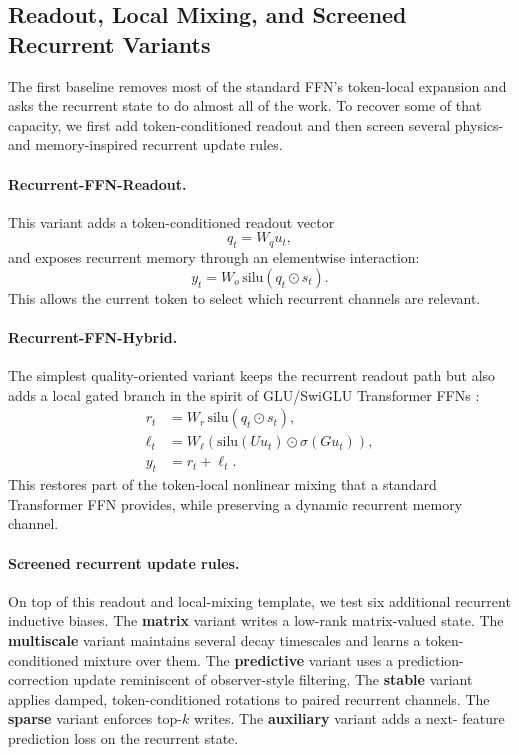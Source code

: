 \documentclass[11pt]{article}
\begin{document}
\subsection{Readout, Local Mixing, and Screened Recurrent Variants}
The first baseline removes most of the standard FFN's token-local expansion and
asks the recurrent state to do almost all of the work. To recover some of that
capacity, we first add token-conditioned readout and then screen several
physics- and memory-inspired recurrent update rules.

\paragraph{Recurrent-FFN-Readout.}
This variant adds a token-conditioned readout vector
\begin{equation}
q_t = W_q u_t,
\end{equation}
and exposes recurrent memory through an elementwise interaction:
\begin{equation}
y_t = W_o \, \mathrm{silu}(q_t \odot s_t).
\end{equation}
This allows the current token to select which recurrent channels are relevant.

\paragraph{Recurrent-FFN-Hybrid.}
The simplest quality-oriented variant keeps the recurrent readout path but also
adds a local gated branch in the spirit of GLU/SwiGLU Transformer FFNs
\citep{shazeer2020glu}:
\begin{align}
r_t &= W_r \, \mathrm{silu}(q_t \odot s_t), \\
\ell_t &= W_\ell \left(\mathrm{silu}(U u_t) \odot \sigma(G u_t)\right), \\
y_t &= r_t + \ell_t.
\end{align}
This restores part of the token-local nonlinear mixing that a standard
Transformer FFN provides, while preserving a dynamic recurrent memory channel.

\paragraph{Screened recurrent update rules.}
On top of this readout and local-mixing template, we test six additional
recurrent inductive biases. The \textbf{matrix} variant writes a low-rank
matrix-valued state. The \textbf{multiscale} variant maintains several decay
timescales and learns a token-conditioned mixture over them. The
\textbf{predictive} variant uses a prediction-correction update reminiscent of
observer-style filtering. The \textbf{stable} variant applies damped,
token-conditioned rotations to paired recurrent channels. The \textbf{sparse}
variant enforces top-$k$ writes. The \textbf{auxiliary} variant adds a next-
feature prediction loss on the recurrent state.
\end{document}
